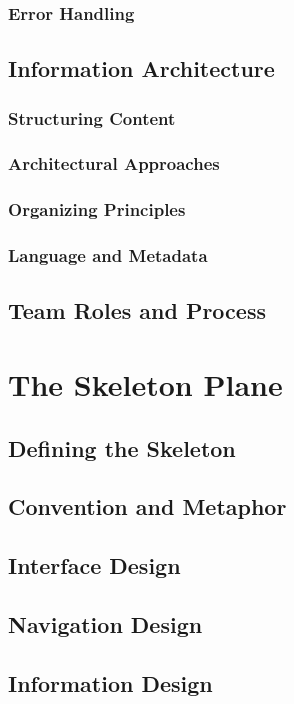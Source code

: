 \documentclass{book}
\begin{document}
            \subsection{Error Handling}
        \section{Information Architecture}
            \subsection{Structuring Content}
            \subsection{Architectural Approaches}
            \subsection{Organizing Principles}
            \subsection{Language and Metadata}
        \section{Team Roles and Process}
    \chapter{The Skeleton Plane}
        \section{Defining the Skeleton}
        \section{Convention and Metaphor}
        \section{Interface Design}
        \section{Navigation Design}
        \section{Information Design}
\end{document}
